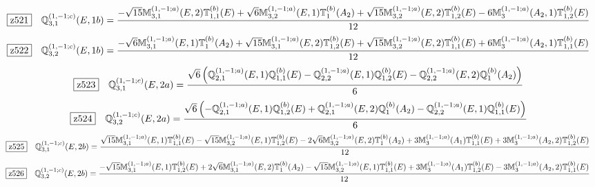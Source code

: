 \documentclass[fleqn,10pt,landscape]{jsarticle}
\begin{document}
\begin{dmath*}
\hspace*{3mm}\fbox{z521}\quad \mathbb{Q}_{3,1}^{(1,-1;c)}(E,1b)=\frac{- \sqrt{15} \mathbb{M}_{3,1}^{(1,-1;a)}(E,2) \mathbb{T}_{1,1}^{(b)}(E) + \sqrt{6} \mathbb{M}_{3,2}^{(1,-1;a)}(E,1) \mathbb{T}_{1}^{(b)}(A_{2}) + \sqrt{15} \mathbb{M}_{3,2}^{(1,-1;a)}(E,2) \mathbb{T}_{1,2}^{(b)}(E) - 6 \mathbb{M}_{3}^{(1,-1;a)}(A_{2},1) \mathbb{T}_{1,2}^{(b)}(E)}{12}
\end{dmath*}
\begin{dmath*}
\hspace*{3mm}\fbox{z522}\quad \mathbb{Q}_{3,2}^{(1,-1;c)}(E,1b)=\frac{- \sqrt{6} \mathbb{M}_{3,1}^{(1,-1;a)}(E,1) \mathbb{T}_{1}^{(b)}(A_{2}) + \sqrt{15} \mathbb{M}_{3,1}^{(1,-1;a)}(E,2) \mathbb{T}_{1,2}^{(b)}(E) + \sqrt{15} \mathbb{M}_{3,2}^{(1,-1;a)}(E,2) \mathbb{T}_{1,1}^{(b)}(E) + 6 \mathbb{M}_{3}^{(1,-1;a)}(A_{2},1) \mathbb{T}_{1,1}^{(b)}(E)}{12}
\end{dmath*}
\begin{dmath*}
\hspace*{3mm}\fbox{z523}\quad \mathbb{Q}_{3,1}^{(1,-1;c)}(E,2a)=\frac{\sqrt{6} \left(\mathbb{Q}_{2,1}^{(1,-1;a)}(E,1) \mathbb{Q}_{1,1}^{(b)}(E) - \mathbb{Q}_{2,2}^{(1,-1;a)}(E,1) \mathbb{Q}_{1,2}^{(b)}(E) - \mathbb{Q}_{2,2}^{(1,-1;a)}(E,2) \mathbb{Q}_{1}^{(b)}(A_{2})\right)}{6}
\end{dmath*}
\begin{dmath*}
\hspace*{3mm}\fbox{z524}\quad \mathbb{Q}_{3,2}^{(1,-1;c)}(E,2a)=\frac{\sqrt{6} \left(- \mathbb{Q}_{2,1}^{(1,-1;a)}(E,1) \mathbb{Q}_{1,2}^{(b)}(E) + \mathbb{Q}_{2,1}^{(1,-1;a)}(E,2) \mathbb{Q}_{1}^{(b)}(A_{2}) - \mathbb{Q}_{2,2}^{(1,-1;a)}(E,1) \mathbb{Q}_{1,1}^{(b)}(E)\right)}{6}
\end{dmath*}
\begin{dmath*}
\hspace*{3mm}\fbox{z525}\quad \mathbb{Q}_{3,1}^{(1,-1;c)}(E,2b)=\frac{\sqrt{15} \mathbb{M}_{3,1}^{(1,-1;a)}(E,1) \mathbb{T}_{1,1}^{(b)}(E) - \sqrt{15} \mathbb{M}_{3,2}^{(1,-1;a)}(E,1) \mathbb{T}_{1,2}^{(b)}(E) - 2 \sqrt{6} \mathbb{M}_{3,2}^{(1,-1;a)}(E,2) \mathbb{T}_{1}^{(b)}(A_{2}) + 3 \mathbb{M}_{3}^{(1,-1;a)}(A_{1}) \mathbb{T}_{1,1}^{(b)}(E) + 3 \mathbb{M}_{3}^{(1,-1;a)}(A_{2},2) \mathbb{T}_{1,2}^{(b)}(E)}{12}
\end{dmath*}
\begin{dmath*}
\hspace*{3mm}\fbox{z526}\quad \mathbb{Q}_{3,2}^{(1,-1;c)}(E,2b)=\frac{- \sqrt{15} \mathbb{M}_{3,1}^{(1,-1;a)}(E,1) \mathbb{T}_{1,2}^{(b)}(E) + 2 \sqrt{6} \mathbb{M}_{3,1}^{(1,-1;a)}(E,2) \mathbb{T}_{1}^{(b)}(A_{2}) - \sqrt{15} \mathbb{M}_{3,2}^{(1,-1;a)}(E,1) \mathbb{T}_{1,1}^{(b)}(E) + 3 \mathbb{M}_{3}^{(1,-1;a)}(A_{1}) \mathbb{T}_{1,2}^{(b)}(E) - 3 \mathbb{M}_{3}^{(1,-1;a)}(A_{2},2) \mathbb{T}_{1,1}^{(b)}(E)}{12}
\end{dmath*}
\end{document}
